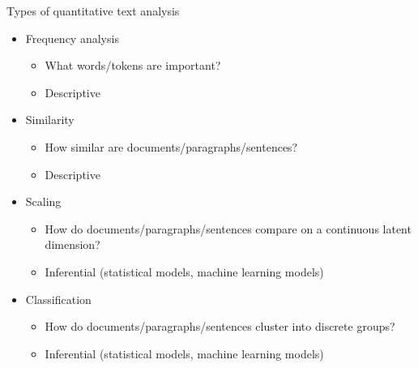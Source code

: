 \documentclass[pdf, 9pt, fleqn, handout]{beamer}
\begin{document}
\begin{frame}{Types of quantitative text analysis}
\begin{itemize}
\item Frequency analysis\\[0.5em]
\begin{itemize}
\item What words/tokens are important? \\[0.5em]
\item Descriptive \\[1em]
\end{itemize}
\item Similarity\\[0.5em]
\begin{itemize}
\item How similar are documents/paragraphs/sentences?  \\[0.5em]
\item Descriptive  \\[1em]
\end{itemize}
\item Scaling\\[0.5em]
\begin{itemize}
\item How do documents/paragraphs/sentences compare on a continuous latent dimension?  \\[0.5em]
\item Inferential (statistical models, machine learning models)  \\[1em]
\end{itemize}
\item Classification\\[0.5em]
\begin{itemize}
\item How do documents/paragraphs/sentences cluster into discrete groups? \\[0.5em]
\item Inferential (statistical models, machine learning models)  \\[1em]
\end{itemize}
\end{itemize}
\end{frame}
\end{document}
